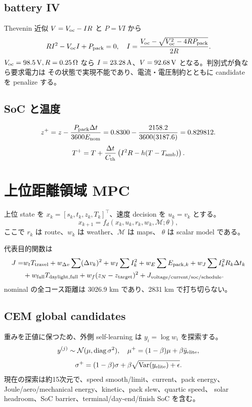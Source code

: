 \subsection{battery IV}
Thevenin 近似 $V=V_{\rm oc}-IR$ と $P=VI$ から
\[
 RI^2-V_{\rm oc}I+P_{\rm pack}=0,
\quad
 I=\frac{V_{\rm oc}-\sqrt{V_{\rm oc}^2-4RP_{\rm pack}}}{2R}.
\]
$V_{\rm oc}=98.5\,{\rm V},R=0.25\,\Omega$ なら
$I=23.28\,{\rm A}$、$V=92.68\,{\rm V}$ となる。判別式が負なら要求電力は
その状態で実現不能であり、電流・電圧制約とともに candidate を penalize する。

\subsection{SoC と温度}
\[
 z^+=z-\frac{P_{\rm pack}\Delta t}{3600E_{\rm nom}}
 =0.8300-\frac{2158.2}{3600(3187.6)}
 =0.829812.
\]
\[
 T^+=T+\frac{\Delta t}{C_{\rm th}}
 \left(I^2R-h(T-T_{\rm amb})\right).
\]



\section{上位距離領域 MPC}
上位 state を $x_k=[s_k,t_k,z_k,T_k]^\top$、速度 decision を
$u_k=v_k$ とする。
\[
 x_{k+1}=f_d(x_k,u_k,r_k,w_k,\mathcal M;\theta),
\]
ここで $r_k$ は route、$w_k$ は weather、$\mathcal M$ は maps、
$\theta$ は scalar model である。

代表目的関数は
\[
\begin{split}
J=&w_tT_{\rm travel}+w_{\Delta v}\sum(\Delta v_k)^2
 + w_I\sum I_k^2+w_E\sum E_{{\rm pack},k}
 +w_J\sum I_k^2R_k\Delta t_k\\
&+w_{\rm full}T_{\rm daylight,full}
 +w_f(z_N-z_{\rm target})^2
 +J_{\rm voltage/current/soc/schedule}.
\end{split}
\]
nominal の全コース距離は 3026.9 km であり、2831 km で打ち切らない。

\subsection{CEM global candidates}
重みを正値に保つため、外側 self-learning は $y_i=\log w_i$ を探索する。
\[
 y^{(j)}\sim\mathcal N(\mu,\operatorname{diag}\sigma^2),
\quad
 \mu^+=(1-\beta)\mu+\beta\bar y_{\rm elite},
\]
\[
 \sigma^+=(1-\beta)\sigma+
\beta\sqrt{\operatorname{Var}(y_{\rm elite})+\epsilon}.
\]
現在の探索は約15次元で、speed smooth/limit、current、pack energy、
Joule/aero/mechanical energy、kinetic、pack slew、quartic speed、
solar headroom、SoC barrier、terminal/day-end/finish SoC を含む。

